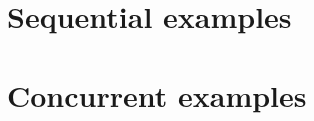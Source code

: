 \documentclass[10pt]{article}
\begin{document}
\section{Sequential examples}

\ResultsSequentialInfo

\vspace{3em}

\ResultsSequentialTimes


\section{Concurrent examples}

\ResultsConcurrentInfo

\vspace{3em}

\ResultsConcurrentTimes
\end{document}
